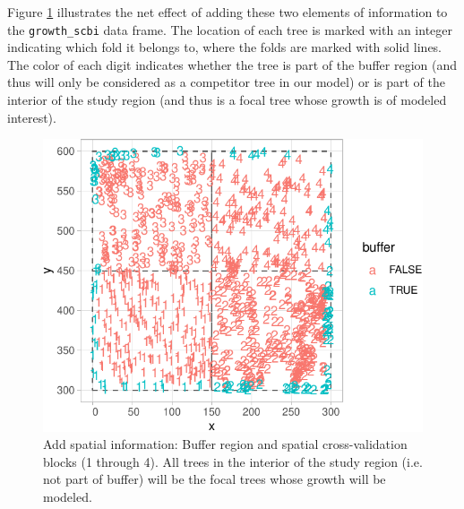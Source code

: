 \documentclass[12pt]{article}
\newenvironment{Shaded}{\begin{snugshade}}{\end{snugshade}}
\newcommand{\DataTypeTok}[1]{\textcolor[rgb]{0.13,0.29,0.53}{#1}}
\newcommand{\DecValTok}[1]{\textcolor[rgb]{0.00,0.00,0.81}{#1}}
\newcommand{\KeywordTok}[1]{\textcolor[rgb]{0.13,0.29,0.53}{\textbf{#1}}}
\newcommand{\NormalTok}[1]{#1}
\newcommand{\OperatorTok}[1]{\textcolor[rgb]{0.81,0.36,0.00}{\textbf{#1}}}
\newcommand{\StringTok}[1]{\textcolor[rgb]{0.31,0.60,0.02}{#1}}
\begin{document}
Figure \ref{fig:scbi-spatial-information} illustrates the net effect of
adding these two elements of information to the \texttt{growth\_scbi}
data frame. The location of each tree is marked with an integer
indicating which fold it belongs to, where the folds are marked with
solid lines. The color of each digit indicates whether the tree is part
of the buffer region (and thus will only be considered as a competitor
tree in our model) or is part of the interior of the study region (and
thus is a focal tree whose growth is of modeled interest).

\begin{Shaded}
\end{Shaded}

\begin{figure}

{\centering \includegraphics[width=0.66\linewidth]{Figures/scbi-spatial-information-1} 

}

\caption{Add spatial information: Buffer region and spatial cross-validation blocks (1 through 4). All trees in the interior of the study region (i.e. not part of buffer) will be the focal trees whose growth will be modeled.}\label{fig:scbi-spatial-information}
\end{figure}
\end{document}
